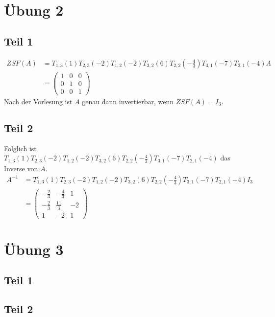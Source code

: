 \documentclass[a4paper,10pt]{article}
\begin{document}
\section*{Übung 2}

\subsection*{Teil 1}

\begin{align*}
 ZSF(A) & = T_{1,3}(1)T_{2,3}(-2)T_{1,2}(-2)T_{3,2}(6)T_{2,2}(-\frac{4}{3})T_{3,1}(-7)T_{2,1}(-4)A\\
  & =
  \begin{pmatrix}
   1 & 0 & 0\\
   0 & 1 & 0\\
   0 & 0 & 1
  \end{pmatrix}
\end{align*}
Nach der Vorlesung ist $A$ genau dann invertierbar, wenn $ZSF(A) = I_3$.

\subsection*{Teil 2}

Folglich ist $T_{1,3}(1)T_{2,3}(-2)T_{1,2}(-2)T_{3,2}(6)T_{2,2}(-\frac{4}{3})T_{3,1}(-7)T_{2,1}(-4)$ das Inverse von $A$.
\begin{align*}
 A^{-1} & = T_{1,3}(1)T_{2,3}(-2)T_{1,2}(-2)T_{3,2}(6)T_{2,2}(-\frac{4}{3})T_{3,1}(-7)T_{2,1}(-4)I_3\\
 & =
  \begin{pmatrix}
   -\frac{2}{3} & -\frac{4}{3} & 1\\
   -\frac{2}{3} & \frac{11}{3} & -2\\
   1 & -2 & 1
  \end{pmatrix}
\end{align*}

\section*{Übung 3}

\subsection*{Teil 1}

\subsection*{Teil 2}
\end{document}

